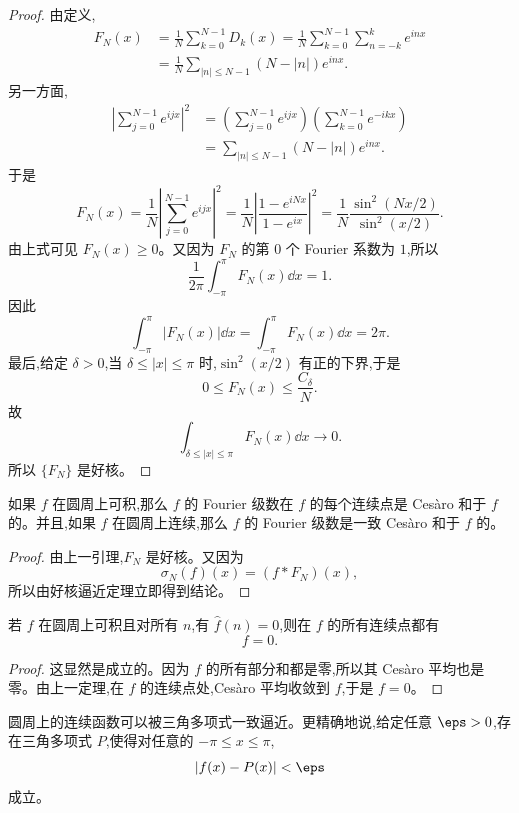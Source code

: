 \begin{proof}
	由定义,
	\[
	\begin{aligned}
		F_N(x)
		&=\frac1N\sum_{k=0}^{N-1}D_k(x)
		=\frac1N\sum_{k=0}^{N-1}\sum_{n=-k}^{k}e^{inx} \\
		&=\frac1N\sum_{|n|\leq N-1}(N-|n|)e^{inx}.
	\end{aligned}
	\]
	另一方面,
	\[
	\begin{aligned}
		\left|\sum_{j=0}^{N-1}e^{ijx}\right|^2
		&=\left(\sum_{j=0}^{N-1}e^{ijx}\right)
		\left(\sum_{k=0}^{N-1}e^{-ikx}\right) \\
		&=\sum_{|n|\leq N-1}(N-|n|)e^{inx}.
	\end{aligned}
	\]
	于是
	\[
	F_N(x)=\frac1N\left|\sum_{j=0}^{N-1}e^{ijx}\right|^2
	=\frac1N\left|\frac{1-e^{iNx}}{1-e^{ix}}\right|^2
	=\frac1N\frac{\sin^2(Nx/2)}{\sin^2(x/2)}.
	\]
	由上式可见 $F_N(x)\geq0$。又因为 $F_N$ 的第 $0$ 个 Fourier 系数为 $1$,所以
	\[
	\frac1{2\pi}\int_{-\pi}^{\pi}F_N(x)\dd x=1.
	\]
	因此
	\[
	\int_{-\pi}^{\pi}|F_N(x)|\dd x=\int_{-\pi}^{\pi}F_N(x)\dd x=2\pi.
	\]
	最后,给定 $\delta>0$,当 $\delta\leq |x|\leq\pi$ 时,$\sin^2(x/2)$ 有正的下界,于是
	\[
	0\leq F_N(x)\leq \frac{C_\delta}{N}.
	\]
	故
	\[
	\int_{\delta\leq |x|\leq\pi}F_N(x)\dd x\to0.
	\]
	所以 $\{F_N\}$ 是好核。
\end{proof}

\begin{theorem}
	如果 $f$ 在圆周上可积,那么 $f$ 的 Fourier 级数在 $f$ 的每个连续点是 Ces\`aro 和于 $f$ 的。并且,如果 $f$ 在圆周上连续,那么 $f$ 的 Fourier 级数是一致 Ces\`aro 和于 $f$ 的。
\end{theorem}

\begin{proof}
	由上一引理,$F_N$ 是好核。又因为
	\[
	\sigma_N(f)(x)=(f\ast F_N)(x),
	\]
	所以由好核逼近定理立即得到结论。
\end{proof}

\begin{corollary}
	若 $f$ 在圆周上可积且对所有 $n$,有 $\widehat f(n)=0$,则在 $f$ 的所有连续点都有
	\[
	f=0.
	\]
\end{corollary}

\begin{proof}
	这显然是成立的。因为 $f$ 的所有部分和都是零,所以其 Ces\`aro 平均也是零。由上一定理,在 $f$ 的连续点处,Ces\`aro 平均收敛到 $f$,于是 $f=0$。
\end{proof}

\begin{corollary}
	圆周上的连续函数可以被三角多项式一致逼近。更精确地说,给定任意 $\eps>0$,存在三角多项式 $P$,使得对任意的 $-\pi\leq x\leq\pi$,
	\[
	|f(x)-P(x)|<\eps
	\]
	成立。
\end{corollary}

